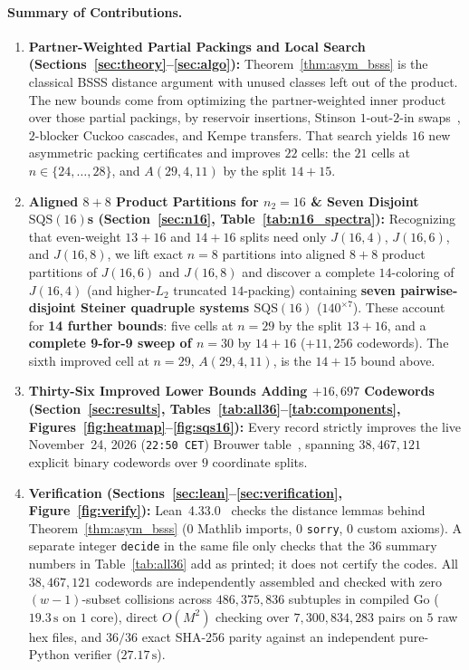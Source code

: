 \documentclass[11pt,letterpaper]{article}
\theoremstyle{plain}
\theoremstyle{definition}
\theoremstyle{remark}
\begin{document}
\paragraph{Summary of Contributions.}
\begin{enumerate}[leftmargin=1.5em,itemsep=2pt]
    \item \textbf{Partner-Weighted Partial Packings and Local Search (Sections~\ref{sec:theory}--\ref{sec:algo}):} Theorem~\ref{thm:asym_bsss} is the classical BSSS distance argument with unused classes left out of the product. The new bounds come from optimizing the partner-weighted inner product over those partial packings, by reservoir insertions, Stinson $1$-out-$2$-in swaps~\cite{Stinson1985}, $2$-blocker Cuckoo cascades, and Kempe transfers. That search yields $16$ new asymmetric packing certificates and improves $22$ cells: the $21$ cells at $n \in \{24,\dots,28\}$, and $A(29,4,11)$ by the split $14{+}15$.
    \item \textbf{Aligned $8{+}8$ Product Partitions for $n_2 = 16$ \& Seven Disjoint $\mathrm{SQS}(16)$s (Section~\ref{sec:n16}, Table~\ref{tab:n16_spectra}):} Recognizing that even-weight $13{+}16$ and $14{+}16$ splits need only $J(16, 4)$, $J(16, 6)$, and $J(16, 8)$, we lift exact $n = 8$ partitions into aligned $8{+}8$ product partitions of $J(16, 6)$ and $J(16, 8)$ and discover a complete $14$-coloring of $J(16, 4)$ (and higher-$L_2$ truncated $14$-packing) containing \textbf{seven pairwise-disjoint Steiner quadruple systems $\mathrm{SQS}(16)$} ($140^{\times 7}$). These account for \textbf{14 further bounds}: five cells at $n = 29$ by the split $13{+}16$, and a \textbf{complete 9-for-9 sweep of $n = 30$} by $14{+}16$ ($+11{,}256$ codewords). The sixth improved cell at $n = 29$, $A(29,4,11)$, is the $14{+}15$ bound above.
    \item \textbf{Thirty-Six Improved Lower Bounds Adding $+16{,}697$ Codewords (Section~\ref{sec:results}, Tables~\ref{tab:all36}--\ref{tab:components}, Figures~\ref{fig:heatmap}--\ref{fig:sqs16}):} Every record strictly improves the live November~24, 2026 (\texttt{22:50 CET}) Brouwer table~\cite{BrouwerAndw}, spanning $38{,}467{,}121$ explicit binary codewords over $9$ coordinate splits.
    \item \textbf{Verification (Sections~\ref{sec:lean}--\ref{sec:verification}, Figure~\ref{fig:verify}):} Lean~4.33.0~\cite{deMouraUllrich2021Lean4} checks the distance lemmas behind Theorem~\ref{thm:asym_bsss} ($0$ Mathlib imports, $0$ \texttt{sorry}, $0$ custom axioms). A separate integer \texttt{decide} in the same file only checks that the $36$ summary numbers in Table~\ref{tab:all36} add as printed; it does not certify the codes. All $38{,}467{,}121$ codewords are independently assembled and checked with zero $(w{-}1)$-subset collisions across $486{,}375{,}836$ subtuples in compiled Go ($19.3\,\mathrm{s}$ on $1$ core), direct $O(M^2)$ checking over $7{,}300{,}834{,}283$ pairs on $5$ raw hex files, and $36/36$ exact SHA-256 parity against an independent pure-Python verifier ($27.17\,\mathrm{s}$).
\end{enumerate}
\end{document}
